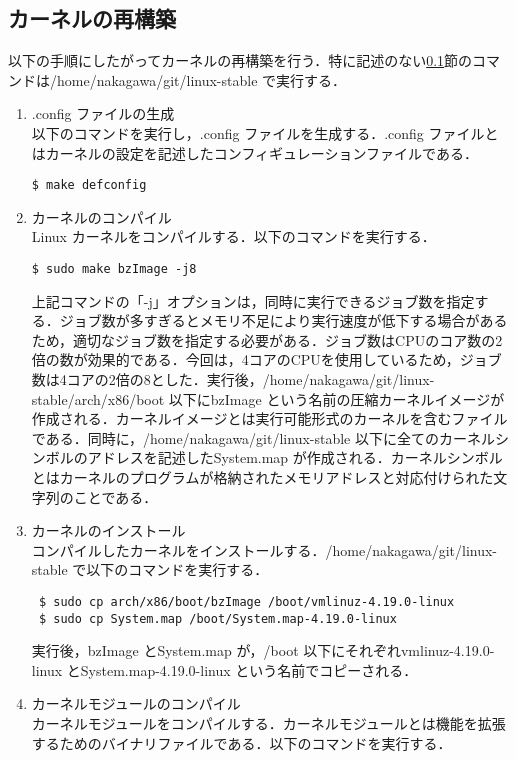 \documentclass[12pt]{jsarticle}
\begin{document}
  \subsection{カーネルの再構築}\label{sec:saikoutiku}
  以下の手順にしたがってカーネルの再構築を行う．特に記述のない\ref{sec:saikoutiku}節のコマンドは/home/nakagawa/git/linux-stable で実行する．
  \begin{enumerate}
  \item .config ファイルの生成\\
    以下のコマンドを実行し，.config ファイルを生成する．.config ファイルとはカーネルの設定を記述したコンフィギュレーションファイルである．
\begin{verbatim}
$ make defconfig
\end{verbatim}
\item カーネルのコンパイル\\
  Linux カーネルをコンパイルする．以下のコマンドを実行する．
\begin{verbatim}
$ sudo make bzImage -j8
\end{verbatim}
上記コマンドの「-j」オプションは，同時に実行できるジョブ数を指定する．ジョブ数が多すぎるとメモリ不足により実行速度が低下する場合があるため，適切なジョブ数を指定する必要がある．ジョブ数はCPUのコア数の2倍の数が効果的である．今回は，4コアのCPUを使用しているため，ジョブ数は4コアの2倍の8とした．実行後，/home/nakagawa/git/linux-stable/arch/x86/boot 以下にbzImage という名前の圧縮カーネルイメージが作成される．カーネルイメージとは実行可能形式のカーネルを含むファイルである．同時に，/home/nakagawa/git/linux-stable 以下に全てのカーネルシンボルのアドレスを記述したSystem.map が作成される．カーネルシンボルとはカーネルのプログラムが格納されたメモリアドレスと対応付けられた文字列のことである．
\item カーネルのインストール\\
  コンパイルしたカーネルをインストールする．/home/nakagawa/git/linux-stable で以下のコマンドを実行する．
\begin{verbatim}
 $ sudo cp arch/x86/boot/bzImage /boot/vmlinuz-4.19.0-linux
 $ sudo cp System.map /boot/System.map-4.19.0-linux
\end{verbatim}
実行後，bzImage とSystem.map が，/boot 以下にそれぞれvmlinuz-4.19.0-linux とSystem.map-4.19.0-linux という名前でコピーされる．
\item カーネルモジュールのコンパイル\\
  カーネルモジュールをコンパイルする．カーネルモジュールとは機能を拡張するためのバイナリファイルである．以下のコマンドを実行する．

\end{enumerate}
\end{document}
